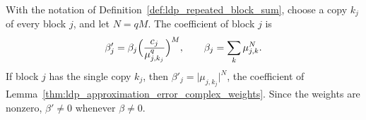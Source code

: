 \begin{definition}
    \label{def:ldp_one_copy_weight}
    \leanok
    With the notation of Definition~\ref{def:ldp_repeated_block_sum}, choose a copy
    $k_j$ of every block $j$, and let $N=qM$. The coefficient of block $j$ is
    \begin{align*}
        \beta'_j=\beta_j\Bigl(\frac{c_j}{\mu_{j,k_j}^q}\Bigr)^M,\qquad
        \beta_j=\sum_k\mu_{j,k}^N.
    \end{align*}
    If block $j$ has the single copy $k_j$, then
    $\beta'_j=\lvert\mu_{j,k_j}\rvert^N$, the coefficient of
    Lemma~\ref{thm:ldp_approximation_error_complex_weights}. Since the weights are
    nonzero, $\beta'\neq0$ whenever $\beta\neq0$.
\end{definition}

